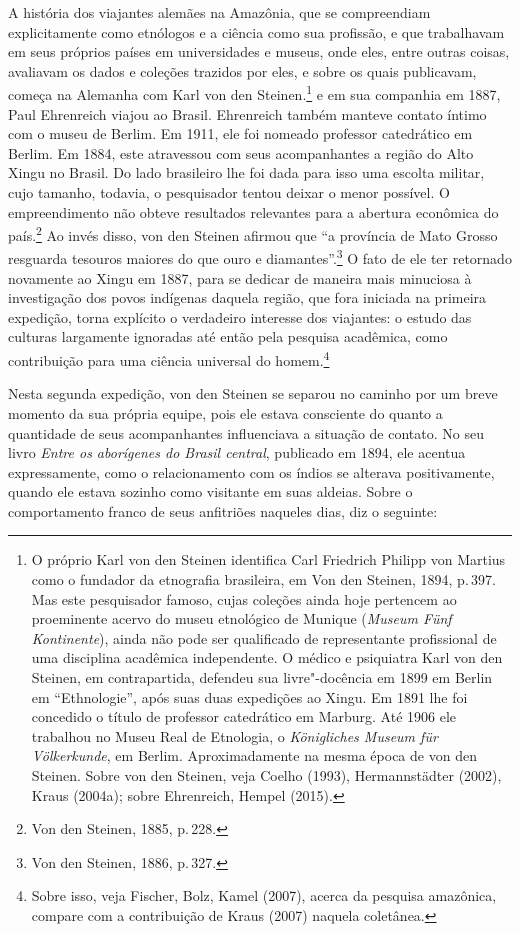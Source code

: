 A história dos viajantes alemães na Amazônia, que se compreendiam
explicitamente como etnólogos e a ciência como sua profissão, e que
trabalhavam em seus próprios países em universidades e museus, onde
eles, entre outras coisas, avaliavam os dados e coleções trazidos por
eles, e sobre os quais publicavam, começa na Alemanha com Karl von den
Steinen.\footnote{O próprio Karl von den Steinen identifica
  Carl Friedrich Philipp von Martius como o fundador da
  etnografia brasileira, em Von den Steinen, 1894, p.\,397. Mas este
  pesquisador famoso, cujas coleções ainda hoje pertencem ao proeminente
  acervo do museu etnológico de Munique (\textit{Museum Fünf Kontinente}),
  ainda não pode ser qualificado de representante profissional de uma
  disciplina acadêmica independente. O médico e psiquiatra Karl von den
  Steinen, em contrapartida, defendeu sua livre"-docência em 1899 em
  Berlin em ``Ethnologie'', após suas duas expedições ao Xingu. Em 1891
  lhe foi concedido o título de professor catedrático em Marburg. Até
  1906 ele trabalhou no Museu Real de Etnologia, o \textit{Königliches
  Museum für Völkerkunde}, em Berlim. Aproximadamente na mesma época de
  von den Steinen. Sobre von den Steinen, veja Coelho (1993), Hermannstädter
  (2002), Kraus (2004a); sobre Ehrenreich, Hempel (2015).} e em sua companhia em 1887, Paul Ehrenreich
 viajou ao Brasil. Ehrenreich também manteve contato íntimo
  com o museu de Berlim. Em 1911, ele foi nomeado professor catedrático
  em Berlim. Em 1884, este
atravessou com seus acompanhantes a região do Alto Xingu no Brasil. Do
lado brasileiro lhe foi dada para isso uma escolta militar, cujo
tamanho, todavia, o pesquisador tentou deixar o menor possível. O
empreendimento não obteve resultados relevantes para a abertura
econômica do país.\footnote{Von den Steinen, 1885, p.\,228.} Ao invés disso, von
den Steinen afirmou que ``a província de Mato Grosso resguarda tesouros
maiores do que ouro e diamantes''.\footnote{Von den Steinen, 1886, p.\,327.} O
fato de ele ter retornado novamente ao Xingu em 1887, para se dedicar de
maneira mais minuciosa à investigação dos povos indígenas daquela
região, que fora iniciada na primeira expedição, torna explícito o
verdadeiro interesse dos viajantes: o estudo das culturas largamente
ignoradas até então pela pesquisa acadêmica, como contribuição para uma
ciência universal do homem.\footnote{Sobre isso, veja Fischer, Bolz,
  Kamel (2007), acerca da pesquisa amazônica, compare com a
  contribuição de Kraus (2007) naquela coletânea.}

Nesta segunda expedição, von den Steinen se separou no caminho por um
breve momento da sua própria equipe, pois ele estava consciente do
quanto a quantidade de seus acompanhantes influenciava a situação de
contato. No seu livro \textit{Entre os aborígenes do Brasil central}, publicado em 1894, ele
acentua expressamente, como o relacionamento com os índios se alterava
positivamente, quando ele estava sozinho como visitante em suas aldeias.
Sobre o comportamento franco de seus anfitriões naqueles dias, diz o
seguinte: 

